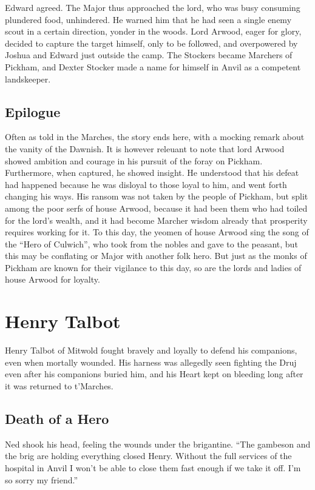 \documentclass[twoside,11pt,b5paper,twocolumn]{scrbook}
\begin{document}
Edward
agreed. The Major thus
approached the lord, who was busy
consuming plundered food,
unhindered. He warned him that he
had seen a single enemy scout in a
certain direction, yonder in the
woods. Lord Arwood, eager for glory,
decided to capture the target himself,
only to be followed, and
overpowered by Joshua and Edward
just outside the camp. The Stockers became Marchers of Pickham, and Dexter Stocker made a name for himself in Anvil as a competent landskeeper.

\subsection{Epilogue}
Often as told in the
Marches, the story ends
here, with a mocking
remark about the vanity of the
Dawnish. It is however
releuant to note that lord Arwood
showed ambition and courage in his
pursuit of the foray on Pickham.
Furthermore, when captured, he
showed insight. He understood that
his defeat had happened because he
was disloyal to those loyal to him,
and went forth changing his ways.
His ransom was not taken by the
people of Pickham, but split among
the poor serfs of house Arwood,
because it had been them who had
toiled for the lord's wealth, and it
had become Marcher wisdom already
that prosperity requires working for
it. To this day, the yeomen of house Arwood
sing the song of the “Hero of
Culwich”, who took from the nobles
and gave to the peasant, but this
may be conflating or Major with
another folk hero. But just as the
monks of Pickham are known for
their vigilance to this day, so are the
lords and ladies of house Arwood for
loyalty.

\section{Henry Talbot}
Henry Talbot of Mitwold fought bravely and loyally to defend his companions, even when mortally wounded. His harness was allegedly seen fighting the Druj even after his companions buried him, and his Heart kept on bleeding long after it was returned to t'Marches.
\subsection{Death of a Hero}
Ned shook his head, feeling the wounds under the brigantine. “The gambeson and the brig are holding everything closed Henry. Without the full services of the hospital in Anvil I won't be able to close them fast enough if we take it off. I'm so sorry my friend.”
\end{document}
